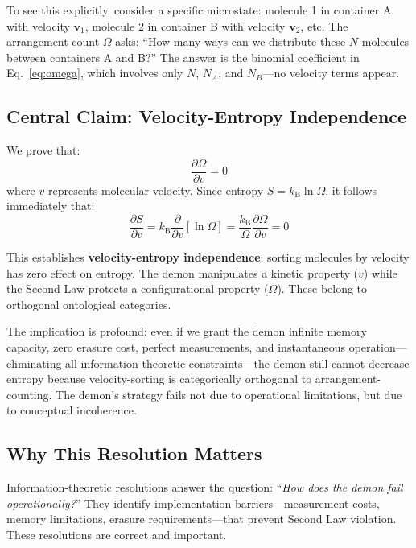 \documentclass[10pt,twocolumn,letterpaper]{article}
\theoremstyle{definition}
\theoremstyle{remark}
\newcommand{\kb}{k_\text{B}}
\newcommand{\pderiv}[2]{\frac{\partial #1}{\partial #2}}
\newcommand{\Om}{\Omega}
\begin{document}
To see this explicitly, consider a specific microstate: molecule 1 in container A with velocity $\mathbf{v}_1$, molecule 2 in container B with velocity $\mathbf{v}_2$, etc. The arrangement count $\Om$ asks: ``How many ways can we distribute these $N$ molecules between containers A and B?'' The answer is the binomial coefficient in Eq.~\eqref{eq:omega}, which involves only $N$, $N_A$, and $N_B$—no velocity terms appear.

\subsection{Central Claim: Velocity-Entropy Independence}

We prove that:
\begin{equation}
\pderiv{\Om}{v} = 0
\label{eq:central}
\end{equation}
where $v$ represents molecular velocity. Since entropy $S = \kb \ln \Om$, it follows immediately that:
\begin{equation}
\pderiv{S}{v} = \kb \pderiv{}{v}[\ln \Om] = \frac{\kb}{\Om} \pderiv{\Om}{v} = 0
\label{eq:entropy_velocity_independence}
\end{equation}

This establishes \textbf{velocity-entropy independence}: sorting molecules by velocity has zero effect on entropy. The demon manipulates a kinetic property ($v$) while the Second Law protects a configurational property ($\Om$). These belong to orthogonal ontological categories.

The implication is profound: even if we grant the demon infinite memory capacity, zero erasure cost, perfect measurements, and instantaneous operation—eliminating all information-theoretic constraints—the demon still cannot decrease entropy because velocity-sorting is categorically orthogonal to arrangement-counting. The demon's strategy fails not due to operational limitations, but due to conceptual incoherence.

\subsection{Why This Resolution Matters}

Information-theoretic resolutions answer the question: ``\textit{How does the demon fail operationally?}'' They identify implementation barriers—measurement costs, memory limitations, erasure requirements—that prevent Second Law violation. These resolutions are correct and important.
\end{document}
